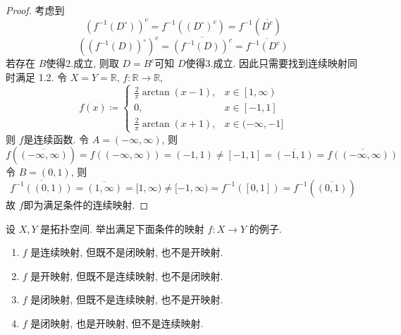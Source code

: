 \documentclass[../main.tex]{subfiles}
\begin{document}
\begin{proof}
   考虑到\[
    \left( f^{-1} \left( D^{\circ} \right)  \right)^c= f^{-1} \left( \left( D^{\circ} \right)^{c}  \right)= f^{-1} \left( \overline{D^{c}} \right)   
    \] \[
    \left( \left( f^{-1} \left( D \right)  \right)^{\circ}  \right)^{c}= \overline{\left( f^{-1} \left( D \right)  \right)^{c} }= \overline{f^{-1} \left( D^{c} \right) } 
    \]若存在 \(  B  \)使得2.成立, 则取 \(  D= B^{c}  \)可知 \(  D  \)使得3.成立. 因此只需要找到连续映射同时满足 1.2.   令 \(  X= Y= \mathbb{R}   \), \(  f:\mathbb{R} \to \mathbb{R}   \), \[
    f\left( x \right)\coloneqq \begin{cases} \frac{ 2 }{ \pi }\arctan \left( x-1 \right),&x \in \left[ 1,\infty \right)\\ 
     0,& x \in \left[ -1,1 \right]\\ 
      \frac{2 }{ \pi }\arctan \left( x+ 1 \right),&x\in (-\infty,-1]       \end{cases}  
    \]  则 \(  f  \)是连续函数.   令 \(  A= \left(-\infty,\infty\right)   \), 则 \[
    f\left( \overline{(-\infty,\infty)} \right)= f\left( \left( -\infty,\infty \right)  \right)= \left( -1,1 \right)\neq [-1,1]= \overline{\left( -1,1 \right) }=  \overline{f\left( \left( -\infty,\infty \right)  \right) }
    \] 令 \(  B  = \left( 0,1 \right) \), 则 \[
    \overline{f^{-1} \left( \left( 0,1 \right)  \right) }=\overline{ \left( 1,\infty \right) }= [1,\infty)\neq [-1,\infty)= f^{-1} \left( \left[ 0,1 \right]  \right)   = f^{-1} \left(\overline{\left( 0,1 \right) } \right)  
    \] 故 \(  f  \)即为满足条件的连续映射. 
\end{proof}
\begin{exercise}{}{}
设 $X, Y$ 是拓扑空间. 举出满足下面条件的映射 $f: X \to Y$ 的例子.
\begin{enumerate}
\item $f$ 是连续映射, 但既不是闭映射, 也不是开映射.
\item $f$ 是开映射, 但既不是连续映射, 也不是闭映射.
\item $f$ 是闭映射, 但既不是连续映射, 也不是开映射.
\item $f$ 是闭映射, 也是开映射, 但不是连续映射.
\end{enumerate}
\end{exercise}
\end{document}
